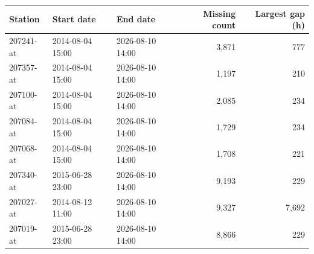 \begin{tabular}{lllrr}
\toprule
Station & Start date & End date & Missing count & Largest gap (h) \\
\midrule
207241-at & 2014-08-04 15:00 & 2026-08-10 14:00 & 3,871 & 777 \\
207357-at & 2014-08-04 15:00 & 2026-08-10 14:00 & 1,197 & 210 \\
207100-at & 2014-08-04 15:00 & 2026-08-10 14:00 & 2,085 & 234 \\
207084-at & 2014-08-04 15:00 & 2026-08-10 14:00 & 1,729 & 234 \\
207068-at & 2014-08-04 15:00 & 2026-08-10 14:00 & 1,708 & 221 \\
207340-at & 2015-06-28 23:00 & 2026-08-10 14:00 & 9,193 & 229 \\
207027-at & 2014-08-12 11:00 & 2026-08-10 14:00 & 9,327 & 7,692 \\
207019-at & 2015-06-28 23:00 & 2026-08-10 14:00 & 8,866 & 229 \\
\bottomrule
\end{tabular}
